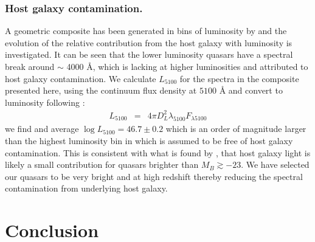 \documentclass{aa}    %
\newcommand{\eqlabel}[1]{\label{eq:#1}}
\newcommand{\sectlabel}[1]{\label{sect:#1}}
\begin{document}
 \subsubsection{Host galaxy contamination.}  \sectlabel{Host galaxy
contamination.}
A geometric composite has been generated in bins of luminosity by
\citet{Shen2011} and the evolution of the relative contribution from the host
galaxy with luminosity is investigated. It can be seen that the lower luminosity
quasars have a spectral break around $\sim$ 4000 \AA, which is lacking at higher
luminosities and attributed to host galaxy contamination. We calculate
$L_{5100}$ for the spectra in the composite presented here, using the continuum
flux density at $5100$ {\AA} and convert to luminosity following
\cite{Netzer2007}:
\begin{eqnarray}\eqlabel{l5100}
L_{5100} &=&    4 \pi D_{L} ^{2} \lambda_{5100}  F_{\lambda5100}
\end{eqnarray}
we find and average $\log L_{5100} = 46.7 \pm 0.2$ which is an order of
magnitude larger than the highest luminosity bin in \cite{Shen2011} which is
assumed to be free of host galaxy contamination. This is consistent with what is
found by \citet{Hopkins2007}, that host galaxy light is likely a small
contribution for quasars brighter than $M_{B} \gtrsim -23$. We have selected our
quasars to be very bright and at high redshift thereby reducing the spectral
contamination from underlying host galaxy. 







\section{Conclusion}  \sectlabel{conclusion}
\end{document}
